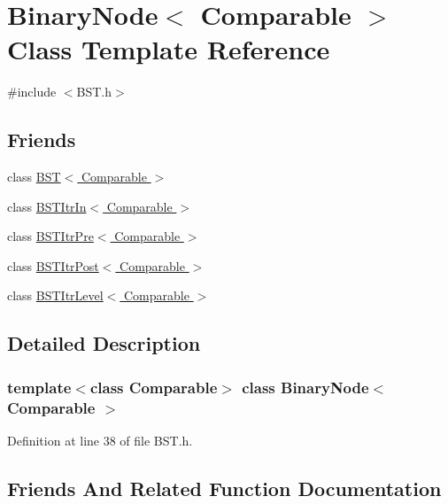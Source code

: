 \hypertarget{class_binary_node}{}\section{Binary\+Node$<$ Comparable $>$ Class Template Reference}
\label{class_binary_node}


{\ttfamily \#include $<$B\+S\+T.\+h$>$}

\subsection*{Friends}
\begin{DoxyCompactItemize}
\item 
class \hyperlink{class_binary_node_a28a1adb9906f3ff7e12c2cb6fa2bd54e}{B\+S\+T$<$ Comparable $>$}
\item 
class \hyperlink{class_binary_node_aab3993acac2ab24a0b59edb0c3acc775}{B\+S\+T\+Itr\+In$<$ Comparable $>$}
\item 
class \hyperlink{class_binary_node_a45a55df6f11541416d4ea7684c575c1a}{B\+S\+T\+Itr\+Pre$<$ Comparable $>$}
\item 
class \hyperlink{class_binary_node_a5dc153694be266f6e772659486219da7}{B\+S\+T\+Itr\+Post$<$ Comparable $>$}
\item 
class \hyperlink{class_binary_node_a26ff00bc0d87069aed877f10fd3c80a8}{B\+S\+T\+Itr\+Level$<$ Comparable $>$}
\end{DoxyCompactItemize}


\subsection{Detailed Description}
\subsubsection*{template$<$class Comparable$>$\newline
class Binary\+Node$<$ Comparable $>$}



Definition at line 38 of file B\+S\+T.\+h.



\subsection{Friends And Related Function Documentation}
\hypertarget{class_binary_node_a28a1adb9906f3ff7e12c2cb6fa2bd54e}{}\label{class_binary_node_a28a1adb9906f3ff7e12c2cb6fa2bd54e} 
